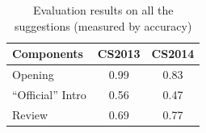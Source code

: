 \begin{table}[t]
\centering
\caption{Evaluation results on all the suggestions (measured by accuracy)} 
\label{table:summary_annotate_all}
\begin{tabular}
{ |l|c|c| }
\hline
Components &   CS2013 & CS2014 \\\hline 
Opening & 0.99 & 0.83 \\ \hline
``Official'' Intro & 0.56 & 0.47 \\ \hline
Review & 0.69 & 0.77 \\ \hline

\hline

\end{tabular}
\end{table}




